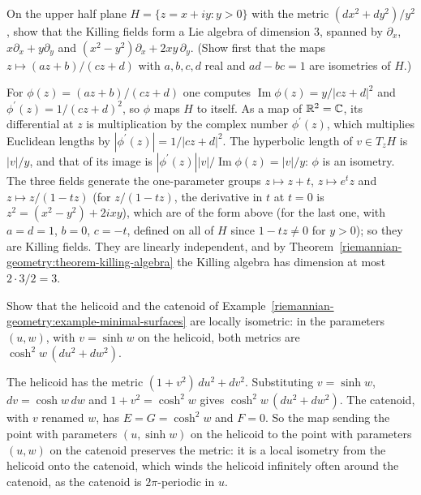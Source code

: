 \begin{exercise}\label{riemannian-geometry:exercise-killing-hyperbolic}
On the upper half plane $H = \{z = x + iy : y > 0\}$ with the metric $(dx^2 + dy^2)/y^2$, show that the Killing fields form a Lie algebra of dimension $3$, spanned by
$\partial_x$, $x\partial_x + y\partial_y$ and $(x^2 - y^2)\partial_x + 2xy\,\partial_y$. (Show first that the maps $z \mapsto (az + b)/(cz + d)$ with $a, b, c, d$ real and
$ad - bc = 1$ are isometries of $H$.)
\end{exercise}

\begin{solution}
For $\phi(z) = (az + b)/(cz + d)$ one computes $\operatorname{Im}\phi(z) = y/|cz + d|^2$ and $\phi^{\prime}(z) = 1/(cz + d)^2$, so $\phi$ maps $H$ to itself. As a map of
$\mathbb{R}^2 = \mathbb{C}$, its differential at $z$ is multiplication by the complex number $\phi^{\prime}(z)$, which multiplies Euclidean lengths by $|\phi^{\prime}(z)| = 1/|cz + d|^2$.
The hyperbolic length of $v \in T_zH$ is $|v|/y$, and that of its image is $|\phi^{\prime}(z)||v|/\operatorname{Im}\phi(z) = |v|/y$: $\phi$ is an isometry. The three fields generate the one-parameter groups
$z \mapsto z + t$, $z \mapsto e^tz$ and $z \mapsto z/(1 - tz)$ (for $z/(1 - tz)$, the derivative in $t$ at $t = 0$ is $z^2 = (x^2 - y^2) + 2ixy$), which are of the form above
(for the last one, with $a = d = 1$, $b = 0$, $c = -t$, defined on all of $H$ since $1 - tz \neq 0$ for $y > 0$); so they are Killing fields. They are linearly independent,
and by Theorem~\ref{riemannian-geometry:theorem-killing-algebra} the Killing algebra has dimension at most $2 \cdot 3/2 = 3$.
\end{solution}

\begin{exercise}\label{riemannian-geometry:exercise-catenoid-helicoid}
Show that the helicoid and the catenoid of Example~\ref{riemannian-geometry:example-minimal-surfaces} are locally isometric: in the parameters $(u, w)$, with $v = \sinh w$ on the
helicoid, both metrics are $\cosh^2w\,(du^2 + dw^2)$.
\end{exercise}

\begin{solution}
The helicoid has the metric $(1 + v^2)\,du^2 + dv^2$. Substituting $v = \sinh w$, $dv = \cosh w\,dw$ and $1 + v^2 = \cosh^2w$ gives $\cosh^2w\,(du^2 + dw^2)$. The catenoid,
with $v$ renamed $w$, has $E = G = \cosh^2w$ and $F = 0$. So the map sending the point with parameters $(u, \sinh w)$ on the helicoid to the point with parameters $(u, w)$ on
the catenoid preserves the metric: it is a local isometry from the helicoid onto the catenoid, which winds the helicoid infinitely often around the catenoid, as the catenoid is
$2\pi$-periodic in $u$.
\end{solution}


